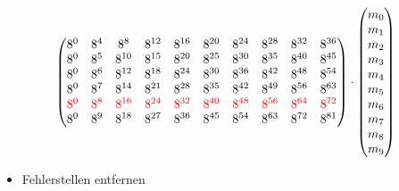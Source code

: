 \documentclass[11pt,aspectratio=169]{beamer}
\begin{document}
\begin{frame}
\[\begin{pmatrix}
			8^0&	8^4&	8^8& 8^{12}& 8^{16}& 8^{20}& 8^{24}& 8^{28}& 8^{32}& 8^{36}\\
			8^0&	8^5& 8^{10}& 8^{15}& 8^{20}& 8^{25}& 8^{30}& 8^{35}& 8^{40}& 8^{45}\\
			8^0&	8^6& 8^{12}& 8^{18}& 8^{24}& 8^{30}& 8^{36}& 8^{42}& 8^{48}& 8^{54}\\
			8^0&	8^7& 8^{14}& 8^{21}& 8^{28}& 8^{35}& 8^{42}& 8^{49}& 8^{56}& 8^{63}\\
			\textcolor{red}{8^0}&	\textcolor{red}{8^8}& \textcolor{red}{8^{16}}& \textcolor{red}{8^{24}}& \textcolor{red}{8^{32}}& \textcolor{red}{8^{40}}& \textcolor{red}{8^{48}}& \textcolor{red}{8^{56}}& \textcolor{red}{8^{64}}& \textcolor{red}{8^{72}}\\
			8^0&	8^9& 8^{18}& 8^{27}& 8^{36}& 8^{45}& 8^{54}& 8^{63}& 8^{72}& 8^{81}\\
		\end{pmatrix}
		\cdot
		\begin{pmatrix}
			m_0 \\ m_1 \\ m_2 \\ m_3 \\ m_4 \\ m_5 \\ m_6 \\ m_7 \\ m_8 \\ m_9 \\
		\end{pmatrix}
		\]
		
		\begin{itemize}
			\item Fehlerstellen entfernen
		\end{itemize}
		
	\end{frame}	
\end{document}
